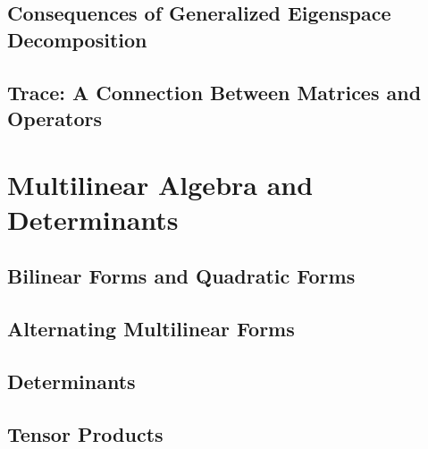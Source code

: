 \documentclass{article}
\begin{document}
\begin{CJK}{UTF8}{gkai}
\subsection{Consequences of Generalized Eigenspace Decomposition}

\subsection{Trace: A Connection Between Matrices and Operators}

\section{Multilinear Algebra and Determinants}

\subsection{Bilinear Forms and Quadratic Forms}

\subsection{Alternating Multilinear Forms}

\subsection{Determinants}

\subsection{Tensor Products}

\end{CJK}
\end{document}
